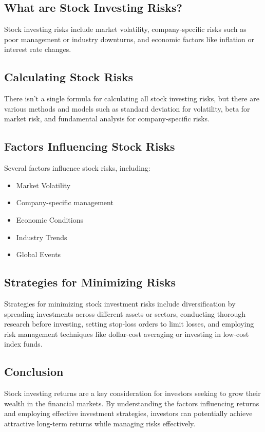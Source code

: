 \subsection{What are Stock Investing Risks?}
Stock investing risks include market volatility, company-specific risks such as poor management or industry downturns, and economic factors like inflation or interest rate changes.

\subsection{Calculating Stock Risks}
There isn't a single formula for calculating all stock investing risks, but there are various methods and models such as standard deviation for volatility, beta for market risk, and fundamental analysis for company-specific risks.

\subsection{Factors Influencing Stock Risks}
Several factors influence stock risks, including:
\begin{itemize}
    \item Market Volatility
    \item Company-specific management
    \item Economic Conditions
    \item Industry Trends
    \item Global Events
\end{itemize}

\subsection{Strategies for Minimizing Risks}
Strategies for minimizing stock investment risks include diversification by spreading investments across different assets or sectors, conducting thorough research before investing, setting stop-loss orders to limit losses, and employing risk management techniques like dollar-cost averaging or investing in low-cost index funds.

\subsection{Conclusion}
Stock investing returns are a key consideration for investors seeking to grow their wealth in the financial markets. By understanding the factors influencing returns and employing effective investment strategies, investors can potentially achieve attractive long-term returns while managing risks effectively.


